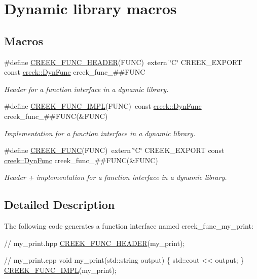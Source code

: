 \hypertarget{group__library__macros}{}\section{Dynamic library macros}
\label{group__library__macros}
\subsection*{Macros}
\begin{DoxyCompactItemize}
\item 
\#define \hyperlink{group__library__macros_ga6b8b4625f72926d8655165b82910b4ed}{C\+R\+E\+E\+K\+\_\+\+F\+U\+N\+C\+\_\+\+H\+E\+A\+D\+ER}(F\+U\+NC)~extern \char`\"{}C\char`\"{} C\+R\+E\+E\+K\+\_\+\+E\+X\+P\+O\+RT const \hyperlink{classcreek_1_1_dyn_func}{creek\+::\+Dyn\+Func} creek\+\_\+func\+\_\+\#\#F\+U\+NC
\begin{DoxyCompactList}\small\item\em Header for a function interface in a dynamic library. \end{DoxyCompactList}\item 
\#define \hyperlink{group__library__macros_ga3fdb5f0d7473238997dd1fa7b796c916}{C\+R\+E\+E\+K\+\_\+\+F\+U\+N\+C\+\_\+\+I\+M\+PL}(F\+U\+NC)~const \hyperlink{classcreek_1_1_dyn_func}{creek\+::\+Dyn\+Func} creek\+\_\+func\+\_\+\#\#F\+U\+NC(\&F\+U\+NC)
\begin{DoxyCompactList}\small\item\em Implementation for a function interface in a dynamic library. \end{DoxyCompactList}\item 
\#define \hyperlink{group__library__macros_ga294c8253110f0c928a7c4b37a95f8f15}{C\+R\+E\+E\+K\+\_\+\+F\+U\+NC}(F\+U\+NC)~extern \char`\"{}C\char`\"{} C\+R\+E\+E\+K\+\_\+\+E\+X\+P\+O\+RT const \hyperlink{classcreek_1_1_dyn_func}{creek\+::\+Dyn\+Func} creek\+\_\+func\+\_\+\#\#F\+U\+NC(\&F\+U\+NC)
\begin{DoxyCompactList}\small\item\em Header + implementation for a function interface in a dynamic library. \end{DoxyCompactList}\end{DoxyCompactItemize}


\subsection{Detailed Description}
The following code generates a function interface named {\ttfamily creek\+\_\+func\+\_\+my\+\_\+print}\+: 
\begin{DoxyCode}
\textcolor{comment}{// my\_print.hpp}
\hyperlink{group__library__macros_ga6b8b4625f72926d8655165b82910b4ed}{CREEK\_FUNC\_HEADER}(my\_print);

\textcolor{comment}{// my\_print.cpp}
\textcolor{keywordtype}{void} my\_print(std::string output) \{
    std::cout << output;
\}
\hyperlink{group__library__macros_ga3fdb5f0d7473238997dd1fa7b796c916}{CREEK\_FUNC\_IMPL}(my\_print);
\end{DoxyCode}


